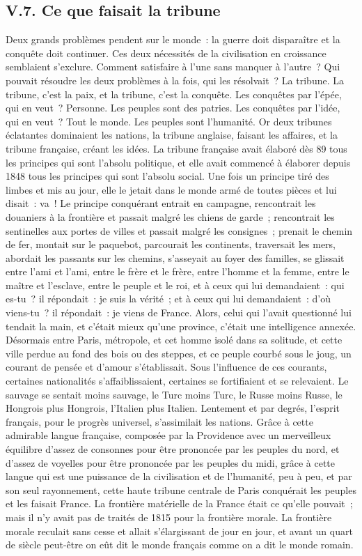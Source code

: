 \documentclass[french,twoside]{book} %
\begin{document}
\subsection[{V.7. Ce que faisait la tribune}]{V.7. Ce que faisait la tribune}
\noindent Deux grands problèmes pendent sur le monde : la guerre doit disparaître et la conquête doit continuer. Ces deux nécessités de la civilisation en croissance semblaient s’exclure. Comment satisfaire à l’une sans manquer à l’autre ? Qui pouvait résoudre les deux problèmes à la fois, qui les résolvait ? La tribune. La tribune, c’est la paix, et la tribune, c’est la conquête. Les conquêtes par l’épée, qui en veut ? Personne. Les peuples sont des patries. Les conquêtes par l’idée, qui en veut ? Tout le monde. Les peuples sont l’humanité. Or deux tribunes éclatantes dominaient les nations, la tribune anglaise, faisant les affaires, et la tribune française, créant les idées. La tribune française avait élaboré dès 89 tous les principes qui sont l’absolu politique, et elle avait commencé à élaborer depuis 1848 tous les principes qui sont l’absolu social. Une fois un principe tiré des limbes et mis au jour, elle le jetait dans le monde armé de toutes pièces et lui disait : va ! Le principe conquérant entrait en campagne, rencontrait les douaniers à la frontière et passait malgré les chiens de garde ; rencontrait les sentinelles aux portes de villes et passait malgré les consignes ; prenait le chemin de fer, montait sur le paquebot, parcourait les continents, traversait les mers, abordait les passants sur les chemins, s’asseyait au foyer des familles, se glissait entre l’ami et l’ami, entre le frère et le frère, entre l’homme et la femme, entre le maître et l’esclave, entre le peuple et le roi, et à ceux qui lui demandaient : qui es-tu ? il répondait : je suis la vérité ; et à ceux qui lui demandaient : d’où viens-tu ? il répondait : je viens de France. Alors, celui qui l’avait questionné lui tendait la main, et c’était mieux qu’une province, c’était une intelligence annexée. Désormais entre Paris, métropole, et cet homme isolé dans sa solitude, et cette ville perdue au fond des bois ou des steppes, et ce peuple courbé sous le joug, un courant de pensée et d’amour s’établissait. Sous l’influence de ces courants, certaines nationalités s’affaiblissaient, certaines se fortifiaient et se relevaient. Le sauvage se sentait moins sauvage, le Turc moins Turc, le Russe moins Russe, le Hongrois plus Hongrois, l’Italien plus Italien. Lentement et par degrés, l’esprit français, pour le progrès universel, s’assimilait les nations. Grâce à cette admirable langue française, composée par la Providence avec un merveilleux équilibre d’assez de consonnes pour être prononcée par les peuples du nord, et d’assez de voyelles pour être prononcée par les peuples du midi, grâce à cette langue qui est une puissance de la civilisation et de l’humanité, peu à peu, et par son seul rayonnement, cette haute tribune centrale de Paris conquérait les peuples et les faisait France. La frontière matérielle de la France était ce qu’elle pouvait ; mais il n’y avait pas de traités de 1815 pour la frontière morale. La frontière morale reculait sans cesse et allait s’élargissant de jour en jour, et avant un quart de siècle peut-être on eût dit le monde français comme on a dit le monde romain.\par
\end{document}
